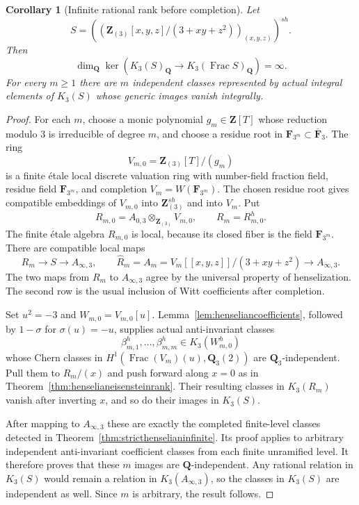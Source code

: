 \documentclass[11pt,a4paper]{article}
\newtheorem{corollary}[theorem]{Corollary}
\theoremstyle{remark}
\newcommand{\Q}{\mathbf Q}
\newcommand{\Z}{\mathbf Z}
\newcommand{\F}{\mathbf F}
\newcommand{\Frac}{\operatorname{Frac}}
\begin{document}
\begin{corollary}[Infinite rational rank before completion]
\label{cor:stricthenselizationinfinite}
Let
\[
 S=\left(\left(\Z_{(3)}[x,y,z]/(3+xy+z^2)\right)_{(x,y,z)}\right)^{sh}.
\]
Then
\[
 \dim_{\Q}\ker\left(K_3(S)_{\Q}
      \longrightarrow K_3(\Frac S)_{\Q}\right)=\infty.
\]
For every $m\geq1$ there are $m$ independent classes represented by
actual integral elements of $K_3(S)$ whose generic images vanish
integrally.
\end{corollary}
\begin{proof}
For each $m$, choose a monic polynomial $g_m\in\Z[T]$ whose reduction
modulo $3$ is irreducible of degree $m$, and choose a residue root in
$\F_{3^m}\subset\overline{\F}_3$.
The ring
\[
 V_{m,0}=\Z_{(3)}[T]/(g_m)
\]
is a finite \'etale local discrete valuation ring with number-field
fraction field, residue field $\F_{3^m}$, and completion
$V_m=W(\F_{3^m})$.  The chosen residue root gives compatible embeddings
of $V_{m,0}$ into $\Z_{(3)}^{sh}$ and into $V_m$.
Put
\[
 R_{m,0}=A_{0,3}\otimes_{\Z_{(3)}}V_{m,0},\qquad R_m=R_{m,0}^h.
\]
The finite \'etale algebra $R_{m,0}$ is local, because its closed fiber
is the field $\F_{3^m}$.  There are compatible local maps
\[
 R_m\longrightarrow S\longrightarrow A_{\infty,3},
 \qquad
 \widehat R_m=A_m=V_m[[x,y,z]]/(3+xy+z^2)
       \longrightarrow A_{\infty,3}.
\]
The two maps from $R_m$ to $A_{\infty,3}$ agree by the universal
property of henselization.  The second row is the usual inclusion of
Witt coefficients after completion.

Set $u^2=-3$ and $W_{m,0}=V_{m,0}[u]$.
Lemma~\ref{lem:henseliancoefficients}, followed by $1-\sigma$ for
$\sigma(u)=-u$, supplies actual anti-invariant classes
\[
 \beta_{m,1}^h,\ldots,\beta_{m,m}^h\in K_3(W_{m,0}^h)
\]
whose Chern classes in $H^1(\Frac(V_m)(u),\Q_3(2))$ are
$\Q_3$-independent.
Pull them to $R_m/(x)$ and push forward along $x=0$ as in
Theorem~\ref{thm:henselianeisensteinrank}.  Their resulting classes in
$K_3(R_m)$ vanish after inverting $x$, and so do their images in
$K_3(S)$.

After mapping to $A_{\infty,3}$ these are exactly the completed
finite-level classes detected in
Theorem~\ref{thm:stricthenselianinfinite}.  Its proof applies to
arbitrary independent anti-invariant coefficient classes from each
finite unramified level.  It therefore proves that these $m$ images
are $\Q$-independent.  Any rational relation in $K_3(S)$ would remain
a relation in $K_3(A_{\infty,3})$, so the classes in $K_3(S)$ are
independent as well.  Since $m$ is arbitrary, the result follows.
\end{proof}
\end{document}
